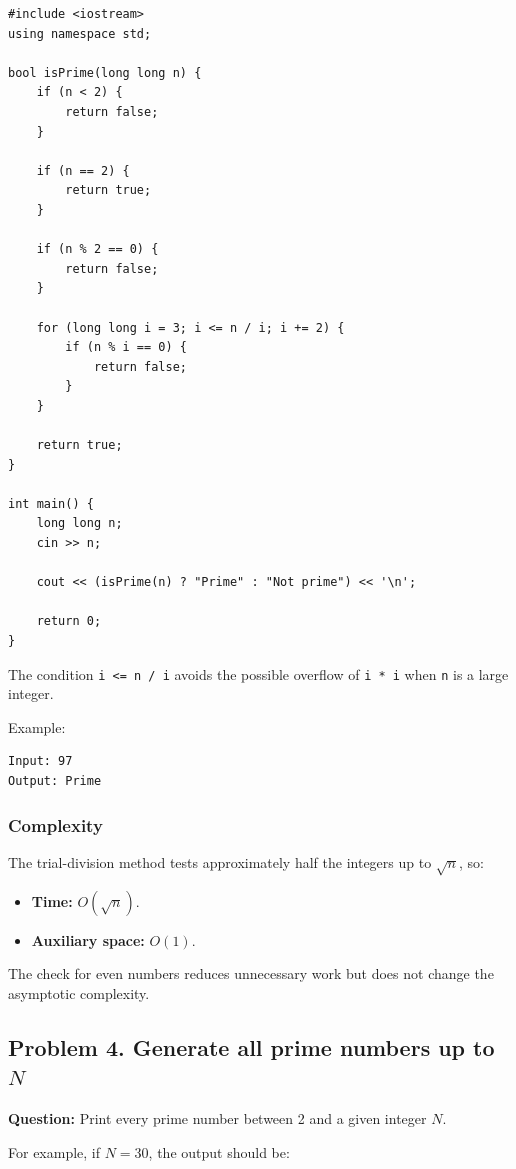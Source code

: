 \begin{lstlisting}[style=cppstyle]
#include <iostream>
using namespace std;

bool isPrime(long long n) {
    if (n < 2) {
        return false;
    }

    if (n == 2) {
        return true;
    }

    if (n % 2 == 0) {
        return false;
    }

    for (long long i = 3; i <= n / i; i += 2) {
        if (n % i == 0) {
            return false;
        }
    }

    return true;
}

int main() {
    long long n;
    cin >> n;

    cout << (isPrime(n) ? "Prime" : "Not prime") << '\n';

    return 0;
}
\end{lstlisting}

The condition \texttt{i <= n / i} avoids the possible overflow of \texttt{i * i} when \texttt{n} is a large integer.

Example:

\begin{lstlisting}[style=pseudocode]
Input: 97
Output: Prime
\end{lstlisting}

\subsubsection{Complexity}

The trial-division method tests approximately half the integers up to $\sqrt n$, so:

\begin{itemize}
    \item \textbf{Time:} $O(\sqrt n)$.
    \item \textbf{Auxiliary space:} $O(1)$.
\end{itemize}

The check for even numbers reduces unnecessary work but does not change the asymptotic complexity.

\subsection{\textbf{Problem 4. Generate all prime numbers up to }$N$}

\textbf{Question:} Print every prime number between 2 and a given integer $N$.

For example, if $N=30$, the output should be:

